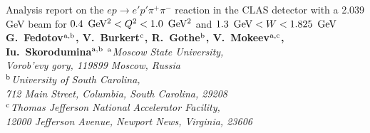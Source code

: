 \thispagestyle{empty}
\begin{center} {\large } \end{center}

\vskip148pt


\begin{center}

{\Large Analysis report on the $e p \rightarrow e' p'
\pi^{+} \pi^{-}$
reaction in the CLAS detector with a 2.039 GeV beam for
$0.4\enskip {\rm GeV^{2}} < Q^{2} < 1.0\enskip {\rm GeV^{2}}$ and
$1.3\enskip {\rm GeV} < W <1.825\enskip {\rm GeV}$}
\vskip18pt
{\bf G.~Fedotov$^{\rm a,b}$, V.~Burkert$^{\rm
c}$,  R.~Gothe$^{\rm b}$,
V.~Mokeev$^{\rm a,c}$, Iu.~Skorodumina$^{\rm a,b}$}
\vskip10pt
{\it $^{\rm a}$Moscow State University, \\[-8pt]
Vorob'evy gory, 119899 Moscow, Russia \\[1pt]
$^{\rm b}$University of South Carolina, \\[-8pt]
712 Main Street, Columbia, South Carolina, 29208 \\[1pt]
$^{\rm c}$Thomas Jefferson National Accelerator Facility, \\[-8pt]
12000 Jefferson Avenue, Newport News, Virginia, 23606}
\end{center}






